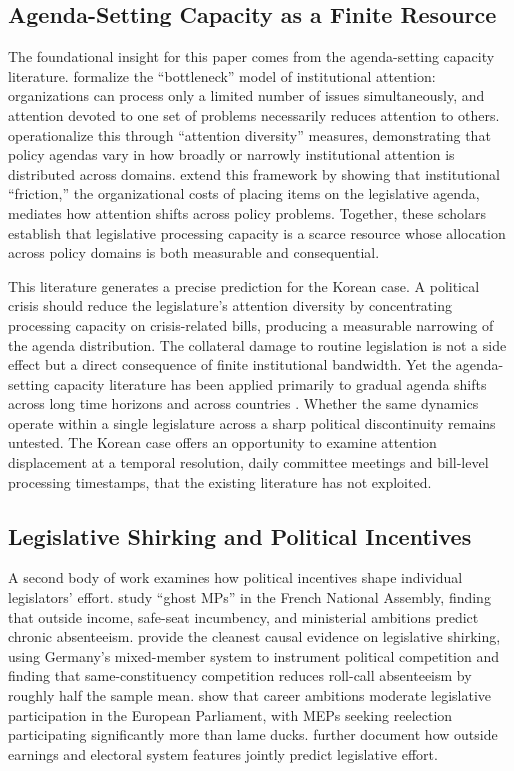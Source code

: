 \documentclass[11pt]{article}
\begin{document}
\subsection{Agenda-Setting Capacity as a Finite Resource}

The foundational insight for this paper comes from the agenda-setting capacity literature. \citet{baumgartner2009} formalize the ``bottleneck'' model of institutional attention: organizations can process only a limited number of issues simultaneously, and attention devoted to one set of problems necessarily reduces attention to others. \citet{boydstun2014} operationalize this through ``attention diversity'' measures, demonstrating that policy agendas vary in how broadly or narrowly institutional attention is distributed across domains. \citet{bevan2014} extend this framework by showing that institutional ``friction,'' the organizational costs of placing items on the legislative agenda, mediates how attention shifts across policy problems. Together, these scholars establish that legislative processing capacity is a scarce resource whose allocation across policy domains is both measurable and consequential.

This literature generates a precise prediction for the Korean case. A political crisis should reduce the legislature's attention diversity by concentrating processing capacity on crisis-related bills, producing a measurable narrowing of the agenda distribution. The collateral damage to routine legislation is not a side effect but a direct consequence of finite institutional bandwidth. Yet the agenda-setting capacity literature has been applied primarily to gradual agenda shifts across long time horizons and across countries \citep{brock2023}. Whether the same dynamics operate within a single legislature across a sharp political discontinuity remains untested. The Korean case offers an opportunity to examine attention displacement at a temporal resolution, daily committee meetings and bill-level processing timestamps, that the existing literature has not exploited.

\subsection{Legislative Shirking and Political Incentives}

A second body of work examines how political incentives shape individual legislators' effort. \citet{gavoille2017} study ``ghost MPs'' in the French National Assembly, finding that outside income, safe-seat incumbency, and ministerial ambitions predict chronic absenteeism. \citet{frank2021} provide the cleanest causal evidence on legislative shirking, using Germany's mixed-member system to instrument political competition and finding that same-constituency competition reduces roll-call absenteeism by roughly half the sample mean. \citet{hoeyland2017} show that career ambitions moderate legislative participation in the European Parliament, with MEPs seeking reelection participating significantly more than lame ducks. \citet{staat2016} further document how outside earnings and electoral system features jointly predict legislative effort.
\end{document}
